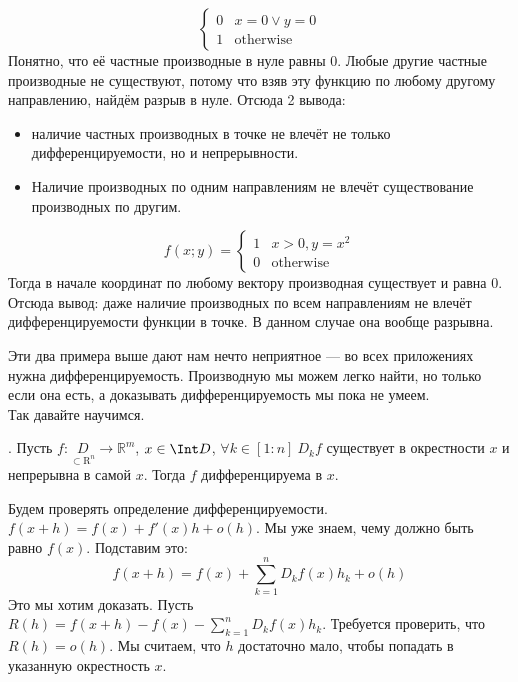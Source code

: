 \documentclass{article}
\begin{document}
\begin{itemize}
\begin{Example}
$$\begin{cases}
                0 & x=0\lor y=0\\
                1 & \mathrm{otherwise}
            \end{cases}$$
            Понятно, что её частные производные в нуле равны 0. Любые другие частные производные не существуют, потому что взяв эту функцию по любому другому направлению, найдём разрыв в нуле. Отсюда 2 вывода:
            \begin{itemize}
                \item наличие частных производных в точке не влечёт не только дифференцируемости, но и непрерывности.
                \item Наличие производных по одним направлениям не влечёт существование производных по другим.
            \end{itemize}
        \end{Example}
        \begin{Example}
            $$f(x;y)=\begin{cases}
                1 & x>0,y=x^2\\
                0 & \mathrm{otherwise}
            \end{cases}$$
            Тогда в начале координат по любому вектору производная существует и равна 0. Отсюда вывод: даже наличие производных по всем направлениям не влечёт дифференцируемости функции в точке. В данном случае она вообще разрывна.
        \end{Example}
        \begin{Comment}
            Эти два примера выше дают нам нечто неприятное --- во всех приложениях нужна дифференцируемость. Производную мы можем легко найти, но только если она есть, а доказывать дифференцируемость мы пока не умеем.\\
            Так давайте научимся.
        \end{Comment}
        \thm {}. Пусть $f\colon\underset{\subset\mathrm R^n}D\to\mathbb R^m$, $x\in\Int D$, $\forall k\in[1:n]~D_kf$ существует в окрестности $x$ и непрерывна в самой $x$. Тогда $f$ дифференцируема в $x$.
        \begin{Proof}
            Будем проверять определение дифференцируемости. $f(x+h)=f(x)+f'(x)h+o(h)$. Мы уже знаем, чему должно быть равно $f(x)$. Подставим это:
            $$
            f(x+h)=f(x)+\sum\limits_{k=1}^nD_kf(x)h_k+o(h)
            $$
            Это мы хотим доказать. Пусть $R(h)=f(x+h)-f(x)-\sum\limits_{k=1}^nD_kf(x)h_k$. Требуется проверить, что $R(h)=o(h)$. Мы считаем, что $h$ достаточно мало, чтобы попадать в указанную окрестность $x$.\\

\end{Proof}
\end{itemize}
\end{document}
